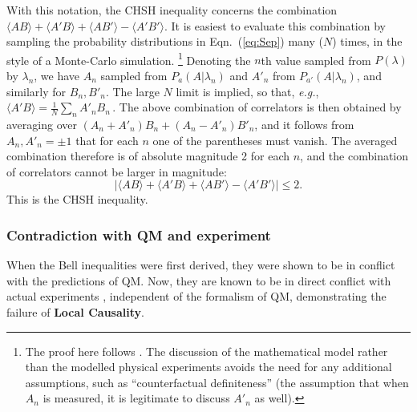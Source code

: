 \documentclass[rmp, aps, preprint, longbibliography]{revtex4-1}
\begin{document}
With this notation, the CHSH inequality concerns the combination
$\langle A B \rangle + \langle A' B \rangle + \langle A B' \rangle - \langle A' B' \rangle$.  It is easiest to evaluate this combination by sampling the probability distributions in Eqn.~(\ref{eq:Sep}) many ($N$) times, in the style of a Monte-Carlo simulation.%
\footnote{The proof here follows \textcite{peres1978}.  The discussion of the mathematical model rather than the modelled physical experiments avoids the need for any additional assumptions, such as ``counterfactual definiteness'' (the assumption that when $A_n$ is measured, it is legitimate to discuss $A'_n$ as well).}
Denoting the $n$th value sampled from $P(\lambda)$ by $\lambda_n$, we have $A_n$ sampled from $P_a(A|\lambda_n)$ and $A'_n$ from $P_{a'}(A|\lambda_n)$, and similarly for $B_n, B'_n$.
The large $N$ limit is implied, so that, \emph{e.g.}, 
$\langle A' B \rangle = \frac{1}{N} \sum_n A'_n B_n \,$.
The above combination of correlators is then obtained by averaging over 
$(A_n + A'_n) B_n + (A_n - A'_n) B'_n$, and it follows from $A_n, A'_n = \pm 1$ that for each $n$ one of the parentheses must vanish.  The averaged combination therefore is of absolute magnitude 2 for each $n$, and the combination of correlators cannot be larger in magnitude:
\begin{equation}
\label{eq:CHSH}
\left | \langle A B \rangle + \langle A' B \rangle + \langle A B' \rangle - \langle A' B' \rangle \right | \le 2.
\end{equation}
This is the CHSH inequality.

\subsubsection{Contradiction with QM and experiment}
\label{sec:contra}

When the Bell inequalities were first derived, they were shown to be in conflict with the predictions of QM\@.  Now, they are known to be in direct conflict with actual experiments \cite{hensen2015,giustina2015,shalm2015,rosenfeld2017}, independent of the formalism of QM, demonstrating the failure of {\bf Local Causality}.
\end{document}

